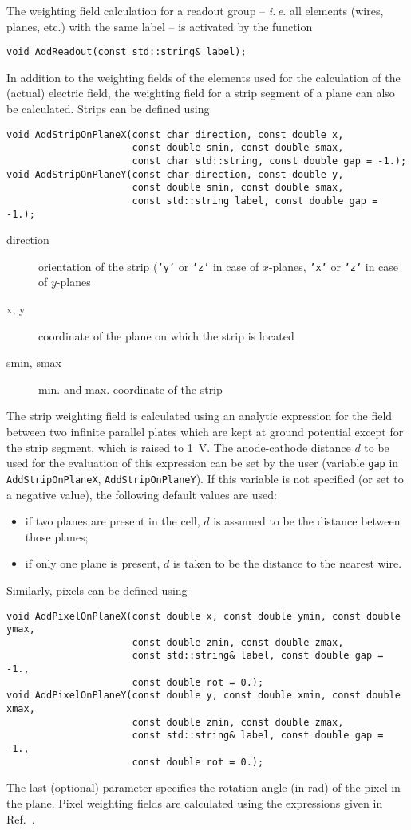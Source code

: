 The weighting field calculation for a readout group 
-- \textit{i.\,e.} all elements (wires, planes, etc.) with the same label --
is activated by the function
\begin{lstlisting}
void AddReadout(const std::string& label);
\end{lstlisting}
In addition to the weighting fields of 
the elements used for the calculation of the 
(actual) electric field, 
the weighting field for a strip segment of a plane 
can also be calculated. 
Strips can be defined using
\begin{lstlisting}
void AddStripOnPlaneX(const char direction, const double x,
                      const double smin, const double smax,
                      const char std::string, const double gap = -1.);
void AddStripOnPlaneY(const char direction, const double y,
                      const double smin, const double smax,
                      const std::string label, const double gap = -1.);
\end{lstlisting} 
\begin{description}
  \item[direction]
  orientation of the strip (\texttt{'y'} or \texttt{'z'} 
  in case of \(x\)-planes, \texttt{'x'} or \texttt{'z'} 
  in case of \(y\)-planes
  \item[x, y] coordinate of the plane on which the strip is located
  \item[smin, smax] min. and max. coordinate of the strip
\end{description}
The strip weighting field is calculated using an analytic expression for  
the field between two infinite parallel plates which are kept at 
ground potential except for the strip segment, which is raised to 1~V.
The anode-cathode distance \(d\) to be used for the evaluation of this 
expression can be set by the user (variable \texttt{gap} in 
\texttt{AddStripOnPlaneX}, \texttt{AddStripOnPlaneY}). 
If this variable is not specified (or set to a negative value), 
the following default values are used:
\begin{itemize}
  \item
  if two planes are present in the cell, \(d\) is  
  assumed to be the distance between those planes;
  \item
  if only one plane is present, \(d\) is taken to be 
  the distance to the nearest wire.
\end{itemize}

Similarly, pixels can be defined using
\begin{lstlisting}
void AddPixelOnPlaneX(const double x, const double ymin, const double ymax,
                      const double zmin, const double zmax,
                      const std::string& label, const double gap = -1., 
                      const double rot = 0.);
void AddPixelOnPlaneY(const double y, const double xmin, const double xmax,
                      const double zmin, const double zmax,
                      const std::string& label, const double gap = -1.,
                      const double rot = 0.);
\end{lstlisting}
The last (optional) parameter specifies the rotation angle (in rad) of the pixel in the plane.
Pixel weighting fields are calculated using the expressions given in 
Ref.~\cite{Riegler2014}.

